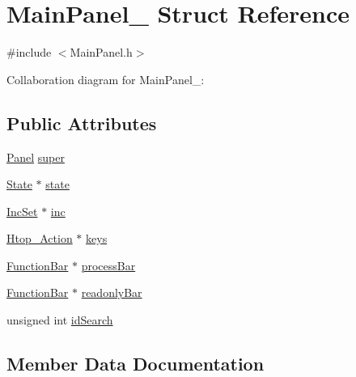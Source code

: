 \hypertarget{structMainPanel__}{}\section{Main\+Panel\+\_\+ Struct Reference}
\label{structMainPanel__}


{\ttfamily \#include $<$Main\+Panel.\+h$>$}



Collaboration diagram for Main\+Panel\+\_\+\+:
\subsection*{Public Attributes}
\begin{DoxyCompactItemize}
\item 
\hyperlink{Panel_8h_a034d4c16521db412dc7a1e8536d16fae}{Panel} \hyperlink{structMainPanel___a736bd6e3af407e7fb6297ca7fe915942}{super}
\item 
\hyperlink{Action_8h_a1e6e0d01a9f6c24cd65838caadbf73b2}{State} $\ast$ \hyperlink{structMainPanel___a82ba106ae3fa46509f65603b60325890}{state}
\item 
\hyperlink{IncSet_8h_a5a093913f0cffb0939e9000ae05e6604}{Inc\+Set} $\ast$ \hyperlink{structMainPanel___a0d3a15ec76d5b45c310a1522ee099d70}{inc}
\item 
\hyperlink{Action_8h_a1c7ea0d086ed493d839ab29d71b3d434}{Htop\+\_\+\+Action} $\ast$ \hyperlink{structMainPanel___a12e6da3f798e0a8d5975b8338c94e260}{keys}
\item 
\hyperlink{FunctionBar_8h_acbf21c40af2139c165bafd8061c2ceda}{Function\+Bar} $\ast$ \hyperlink{structMainPanel___af8530a93d580a69f57935092371a405d}{process\+Bar}
\item 
\hyperlink{FunctionBar_8h_acbf21c40af2139c165bafd8061c2ceda}{Function\+Bar} $\ast$ \hyperlink{structMainPanel___a679693b5454c13c85d6a76c83474c6fa}{readonly\+Bar}
\item 
unsigned int \hyperlink{structMainPanel___a2147efab1210f5d3ef0e5664a307f950}{id\+Search}
\end{DoxyCompactItemize}


\subsection{Member Data Documentation}
\mbox{\label{structMainPanel___a2147efab1210f5d3ef0e5664a307f950}} 
